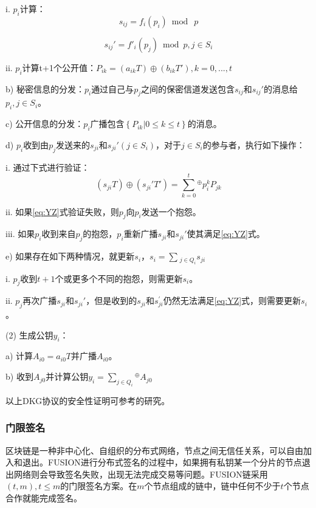 \documentclass[a4paper,12pt]{article}
\begin{document}
i. $p_i$计算：
\begin{equation}
  \label{eq:TA}
 s_{ij}=f_i(p_i) \bmod \ p
\end{equation}

\begin{equation}
  \label{eq:TA}
 {s_{ij}}' = f{'_i}\left( {{p_j}} \right)\bmod p,j \in {S_i}%
\end{equation}

ii. $p_i$计算t+1个公开值：${P_{ik}} = \left( {{a_{ik}}T} \right) \oplus \left( {{b_{ik}}T'} \right),k = 0,...,t$

b) 秘密信息的分发：$p_i$通过自己与$p_j$之间的保密信道发送包含$s_{ij}$和${s_{ij}}'$的消息给$p_i,j\in S_i$。

c) 公开信息的分发：$p_i$广播包含$\left\{ {{P_{ik}}|0 \le k \le t} \right\}$的消息。

d) $p_i$收到由$p_j$发送来的$s_{ji}$和${s_{ji}}'\left( j\in S_i\right) $，对于$j\in S_i$的参与者，执行如下操作：

i. 通过下式进行验证：
\begin{equation}
  \label{eq:YZ}
\left( {{s_{ji}}T} \right) \oplus \left( {{s_{ji}}'T'} \right) = \sum\limits_{k = 0} ^t {} ^\oplus  p_i^k{P_{jk}}
\end{equation}

ii. 如果\ref{eq:YZ}式验证失败，则$p_j$向$p_i$发送一个抱怨。

iii. 如果$p_i$收到来自$p_j$的抱怨，$p_i$重新广播$s_{ji}$和${s_{ji}}'$使其满足\ref{eq:YZ}式。

e) 如果存在如下两种情况，就更新$s_i$，${s_i} = \sum\limits_{}^{} {_{j \in {Q_i}}{s_{ji}}} $

i. $p_j$收到$t+1$个或更多个不同的抱怨，则需更新$s_i$。

ii. $p_j$再次广播$s_{ji}$和${s_{ji}}'$，但是收到的$s_{ji}$和$s_{ji}^{'}$仍然无法满足\ref{eq:YZ}式，则需要更新$s_i$。

(2) 生成公钥$y_i$：

a) 计算$A_{i0}=a_{i0}T$并广播$A_{i0}$。

b) 收到$A_{j0}$并计算公钥${y_i} = \sum\limits_{j \in {Q_i}}^{} {^ \oplus } {A_{j0}}$

以上DKG协议的安全性证明可参考\cite{Gennaro1999}的研究。
	
\subsubsection{门限签名}

区块链是一种非中心化、自组织的分布式网络，节点之间无信任关系，可以自由加入和退出。FUSION进行分布式签名的过程中，如果拥有私钥某一个分片的节点退出网络则会导致签名失败，出现无法完成交易等问题。FUSION链采用$\left( t,m\right) ,t \le  m$的门限签名方案\citep{Shamir1979}。在$m$个节点组成的链中，链中任何不少于$t$个节点合作就能完成签名。
\end{document}
